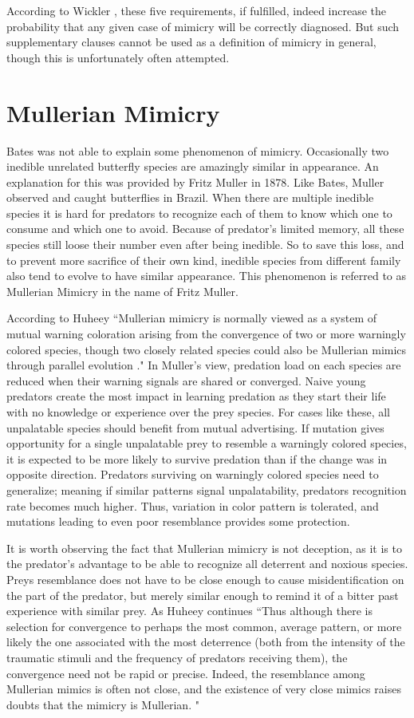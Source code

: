 According to Wickler \cite{wickler1986}, these five requirements, if fulfilled, indeed increase the probability that any given case of mimicry will be correctly diagnosed. But such supplementary clauses cannot be used as a definition of mimicry in general, though this is unfortunately often attempted. 

\section{Mullerian Mimicry}
Bates was not able to explain some phenomenon of mimicry. Occasionally two inedible unrelated butterfly species are amazingly similar in appearance. An explanation for this was provided by Fritz Muller in 1878. Like Bates, Muller observed and caught butterflies in Brazil. When there are multiple inedible species it is hard for predators to recognize each of them to know which one to consume and which one to avoid. Because of predator's limited memory, all these species still loose their number even after being inedible. So to save this loss, and to prevent more sacrifice of their own kind, inedible species from different family also tend to evolve to have similar appearance. This phenomenon is referred to as Mullerian Mimicry in the name of Fritz Muller.

According to Huheey \cite{huheey1988} ``Mullerian mimicry is normally viewed as a system of mutual warning coloration arising from the convergence of two or more warningly colored species, though two closely related species could also be Mullerian mimics through parallel evolution \cite{muller1879}." In Muller's view, predation load on each species are reduced when their warning signals are shared or converged. Naive young predators create the most impact in learning predation as they start their life with no knowledge or experience over the prey species. For cases like these, all unpalatable species should benefit from mutual advertising. If mutation gives opportunity for a single unpalatable prey to resemble a warningly colored species, it is expected to be more likely to survive predation than if the change was in opposite direction. Predators surviving on warningly colored species need to generalize; meaning if similar patterns signal unpalatability, predators recognition rate becomes much higher. Thus, variation in color pattern is tolerated, and mutations leading to even poor resemblance provides some protection. 

It is worth observing the fact that Mullerian mimicry is not deception, as it is to the predator's advantage to be able to recognize all deterrent and noxious species. Preys resemblance does not have to be close enough to cause misidentification on the part of the predator, but merely similar enough to remind it of a bitter past experience with similar prey. As Huheey continues ``Thus although there is selection for convergence to perhaps the most common, average pattern, or more likely the one associated with the most deterrence (both from the intensity of the traumatic stimuli and the frequency of predators receiving them), the convergence need not be rapid or precise. Indeed, the resemblance among Mullerian mimics is often not close, and the existence of very close mimics raises doubts that the mimicry is Mullerian. "

